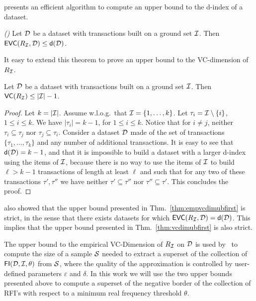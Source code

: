 \citet{RiondatoU12} presents an efficient algorithm to compute an upper bound to
the d-index of a dataset.

\begin{theorem}\label{thm:empvcdimubfirst}
  \emph{(\citep[Thm.~3]{RiondatoU12})} Let ${\cal D}$ be a dataset  with
  transactions built on a ground set ${\cal I}$. Then $\mathsf{EVC}(R_{\cal I},{\cal D})\le
  \mathsf{d}({\cal D})$.
\end{theorem}

It easy to extend this theorem to prove an upper bound to the VC-dimension of
$R_{\cal I}$.
\begin{theorem}\label{thm:vcdimubfirst}
  Let ${\cal D}$ be a dataset with transactions built on a ground set ${\cal I}$. Then
  $\mathsf{VC}(R_{\cal I})\le |{\cal I}|-1$.
\end{theorem}
\begin{proof}
  Let $k=|{\cal I}|$. Assume w.l.o.g.~that ${\cal I}=\{1,\dotsc,k\}$. Let
  $\tau_i={\cal I}\setminus\{i\}$, $1\le i\le k$. We have $|\tau_i|=k-1$, for $1\le
  i\le k$. Notice that for $i\neq j$, neither $\tau_i\subseteq\tau_j$ nor
  $\tau_j\subseteq\tau_i$. Consider a dataset ${\cal D}$ made of the set of
  transactions $\{\tau_1,\dotsc,\tau_k\}$ and any number of additional
  transactions. It is easy to see that $\mathsf{d}({\cal D})=k-1$, and that
  it is impossible to build a dataset with a larger d-index using the items of
  ${\cal I}$, because there is no way to use the items of ${\cal I}$ to build $\ell>k-1$
  transactions of length at least $\ell$ and such that for any two of these
  transactions $\tau',\tau''$ we have neither $\tau'\subseteq \tau''$ nor
  $\tau''\subseteq \tau'$. This concludes the proof.
\end{proof}

\citet{RiondatoU12} also showed that the upper bound presented in
Thm.~\ref{thm:empvcdimubfirst} is strict, in the sense that there exists
datasets for which $\mathsf{EVC}(R_{\cal I},{\cal D})=\mathsf{d}({\cal D})$. This implies that the
upper bound presented in Thm.~\ref{thm:vcdimubfirst} is also strict.

The upper bound to the empirical VC-Dimension of $R_{\cal I}$ on ${\cal D}$ is used
by~\citet{RiondatoU12} to compute the size of a sample ${\cal S}$ needed to extract
a superset of the collection of $\mathsf{FI}({\cal D},{\cal I},\theta)$ from ${\cal S}$, where the
quality of the approximation is controlled by user-defined parameters
$\varepsilon$ and $\delta$. In this work we will use the two upper bounds
presented above to compute a superset of the negative border of the collection
of RFI's with respect to a minimum real frequency threshold $\theta$.

